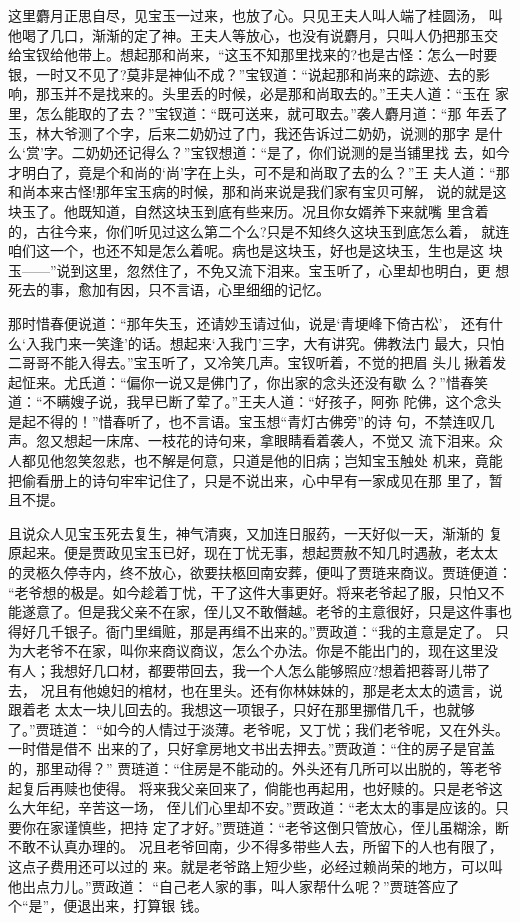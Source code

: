 这里麝月正思自尽，见宝玉一过来，也放了心。只见王夫人叫人端了桂圆汤，
叫他喝了几口，渐渐的定了神。王夫人等放心，也没有说麝月，只叫人仍把那玉交
给宝钗给他带上。想起那和尚来，“这玉不知那里找来的?也是古怪：怎么一时要
银，一时又不见了?莫非是神仙不成？”宝钗道：“说起那和尚来的踪迹、去的影
响，那玉并不是找来的。头里丢的时候，必是那和尚取去的。”王夫人道：“玉在
家里，怎么能取的了去？”宝钗道：“既可送来，就可取去。”袭人麝月道：“那
年丢了玉，林大爷测了个字，后来二奶奶过了门，我还告诉过二奶奶，说测的那字
是什么‘赏’字。二奶奶还记得么？”宝钗想道：“是了，你们说测的是当铺里找
去，如今才明白了，竟是个和尚的‘尚’字在上头，可不是和尚取了去的么？”王
夫人道：“那和尚本来古怪!那年宝玉病的时候，那和尚来说是我们家有宝贝可解，
说的就是这块玉了。他既知道，自然这块玉到底有些来历。况且你女婿养下来就嘴
里含着的，古往今来，你们听见过这么第二个么?只是不知终久这块玉到底怎么着，
就连咱们这一个，也还不知是怎么着呢。病也是这块玉，好也是这块玉，生也是这
块玉——”说到这里，忽然住了，不免又流下泪来。宝玉听了，心里却也明白，更
想死去的事，愈加有因，只不言语，心里细细的记忆。

那时惜春便说道：“那年失玉，还请妙玉请过仙，说是‘青埂峰下倚古松’，
还有什么‘入我门来一笑逢’的话。想起来‘入我门’三字，大有讲究。佛教法门
最大，只怕二哥哥不能入得去。”宝玉听了，又冷笑几声。宝钗听着，不觉的把眉
头儿揪着发起怔来。尤氏道：“偏你一说又是佛门了，你出家的念头还没有歇
么？”惜春笑道：“不瞒嫂子说，我早已断了荤了。”王夫人道：“好孩子，阿弥
陀佛，这个念头是起不得的！”惜春听了，也不言语。宝玉想“青灯古佛旁”的诗
句，不禁连叹几声。忽又想起一床席、一枝花的诗句来，拿眼睛看着袭人，不觉又
流下泪来。众人都见他忽笑忽悲，也不解是何意，只道是他的旧病；岂知宝玉触处
机来，竟能把偷看册上的诗句牢牢记住了，只是不说出来，心中早有一家成见在那
里了，暂且不提。

且说众人见宝玉死去复生，神气清爽，又加连日服药，一天好似一天，渐渐的
复原起来。便是贾政见宝玉已好，现在丁忧无事，想起贾赦不知几时遇赦，老太太
的灵柩久停寺内，终不放心，欲要扶柩回南安葬，便叫了贾琏来商议。贾琏便道：
“老爷想的极是。如今趁着丁忧，干了这件大事更好。将来老爷起了服，只怕又不
能遂意了。但是我父亲不在家，侄儿又不敢僭越。老爷的主意很好，只是这件事也
得好几千银子。衙门里缉赃，那是再缉不出来的。”贾政道：“我的主意是定了。
只为大老爷不在家，叫你来商议商议，怎么个办法。你是不能出门的，现在这里没
有人；我想好几口材，都要带回去，我一个人怎么能够照应?想着把蓉哥儿带了去，
况且有他媳妇的棺材，也在里头。还有你林妹妹的，那是老太太的遗言，说跟着老
太太一块儿回去的。我想这一项银子，只好在那里挪借几千，也就够了。”贾琏道：
“如今的人情过于淡薄。老爷呢，又丁忧；我们老爷呢，又在外头。一时借是借不
出来的了，只好拿房地文书出去押去。”贾政道：“住的房子是官盖的，那里动得？”
贾琏道：“住房是不能动的。外头还有几所可以出脱的，等老爷起复后再赎也使得。
将来我父亲回来了，倘能也再起用，也好赎的。只是老爷这么大年纪，辛苦这一场，
侄儿们心里却不安。”贾政道：“老太太的事是应该的。只要你在家谨慎些，把持
定了才好。”贾琏道：“老爷这倒只管放心，侄儿虽糊涂，断不敢不认真办理的。
况且老爷回南，少不得多带些人去，所留下的人也有限了，这点子费用还可以过的
来。就是老爷路上短少些，必经过赖尚荣的地方，可以叫他出点力儿。”贾政道：
“自己老人家的事，叫人家帮什么呢？”贾琏答应了个“是”，便退出来，打算银
钱。

